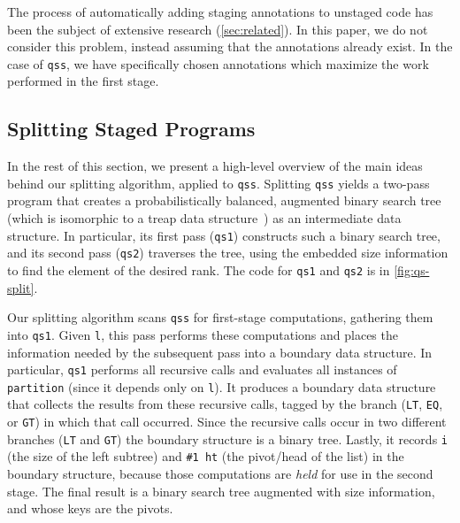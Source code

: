 \begin{abstrsyn}
The process of automatically adding staging annotations to unstaged code has been
the subject of extensive research (\ref{sec:related}). In this paper, we do not
consider this problem, instead assuming that the annotations already exist.
In the case of \texttt{qss}, we have specifically chosen annotations which
maximize the work performed in the first stage.

\subsection{Splitting Staged Programs}



In the rest of this section, we present a high-level overview of the main ideas
behind our splitting algorithm, applied to \texttt{qss}.
%
Splitting \texttt{qss} yields a two-pass program that creates a
probabilistically balanced, augmented binary search tree (which is isomorphic to
a treap data structure~\cite{SeidelAr96}) as an intermediate data structure. In
particular, its first pass (\texttt{qs1}) constructs such a binary search tree,
and its second pass (\texttt{qs2}) traverses the tree, using the embedded size
information to find the element of the desired rank.
%
The code for \texttt{qs1} and \texttt{qs2} is in \ref{fig:qs-split}.


Our splitting algorithm scans \texttt{qss} for first-stage computations,
gathering them into \texttt{qs1}. Given \texttt{l}, this pass performs these
computations and places the information needed by the subsequent pass into a
boundary data structure.
%
In particular, \texttt{qs1} performs all recursive calls and evaluates all
instances of \texttt{partition} (since it depends only on \texttt{l}). It
produces a boundary data structure that collects the results from these
recursive calls, tagged by the branch (\texttt{LT}, \texttt{EQ}, or \texttt{GT})
in which that call occurred. Since the recursive calls occur in two different
branches (\texttt{LT} and \texttt{GT}) the boundary structure is a binary tree.  
%
Lastly, it records \texttt{i} (the size of the left subtree) and \texttt{\#1 ht}
(the pivot/head of the list) in the boundary structure, because those
computations are \emph{held} for use in the second stage.
%
The final result is a binary search tree augmented with size information, and
whose keys are the pivots.


\end{abstrsyn}
